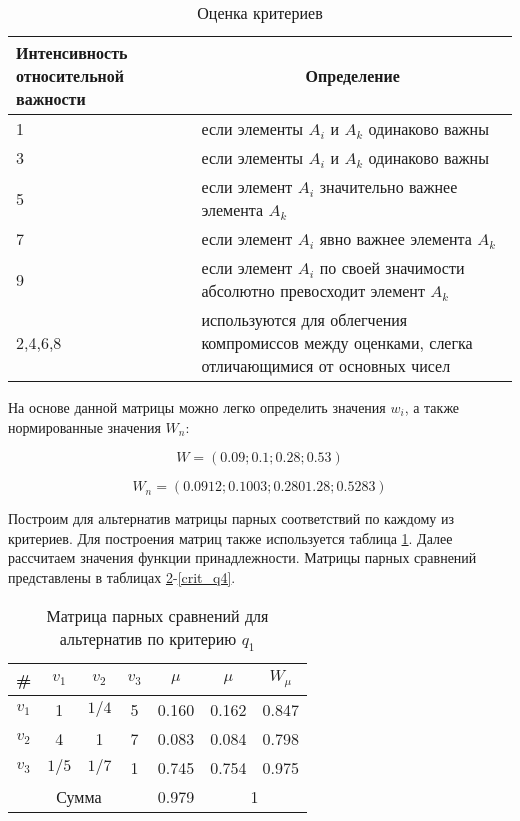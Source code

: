 \begin{table}[H]
  \caption{Оценка критериев}\label{crit_scale}
  \begin{tabular}{|p{4cm}|p{12cm}|}
  \hline Интенсивность относительной важности & \multicolumn{1}{|c|}{Определение} \\
  \hline 1 & если элементы $A_i$ и $A_k$ одинаково важны \\
  \hline 3 & если элементы $A_i$ и $A_k$ одинаково важны \\
  \hline 5 & если элемент $A_i$ значительно важнее элемента $A_k$ \\
  \hline 7 & если элемент $A_i$ явно важнее элемента $A_k$ \\
  \hline 9 & если элемент $A_i$ по своей значимости абсолютно превосходит элемент $A_k$ \\
  \hline 2,4,6,8 & используются для облегчения компромиссов между оценками, слегка отличающимися от основных чисел \\
  \hline
  \end{tabular}
\end{table}

На основе данной матрицы можно легко определить значения $w_i$, а также нормированные значения $W_n$:

\begin{equation}
    W=(0.09;0.1;0.28;0.53)
\end{equation}

\begin{equation}
    W_n=(0.0912;0.1003;0.2801.28;0.5283)
\end{equation}

Построим для альтернатив матрицы парных соответствий по каждому из критериев. 
Для построения матриц также используется таблица \ref{crit_scale}. 
Далее рассчитаем значения функции принадлежности.
Матрицы парных сравнений представлены в таблицах \ref{crit_q1}-\ref{crit_q4}.

\begin{table}[H]
    \centering
    \caption{Матрица парных сравнений для альтернатив по критерию $q_1$}\label{crit_q1}
    \begin{tabular}{|c|c|c|c|c|c|c|}
    \hline \# & $v_1$ & $v_2$ & $v_3$ & $\mu$ & $\mu$ & $W_{\mu}$ \\
    \hline $v_1$ & 1 & $1/4$ & 5 & 0.160 & 0.162 & 0.847 \\
    \hline $v_2$ & 4 & 1 & 7 &  0.083 & 0.084 & 0.798\\
    \hline $v_3$ & $1/5$ & $1/7$ & 1 & 0.745 & 0.754 & 0.975 \\
    \hline \multicolumn{4}{|c|}{Сумма} & 0.979 & \multicolumn{2}{|c|}{1} \\
    \hline
    \end{tabular}
\end{table}

